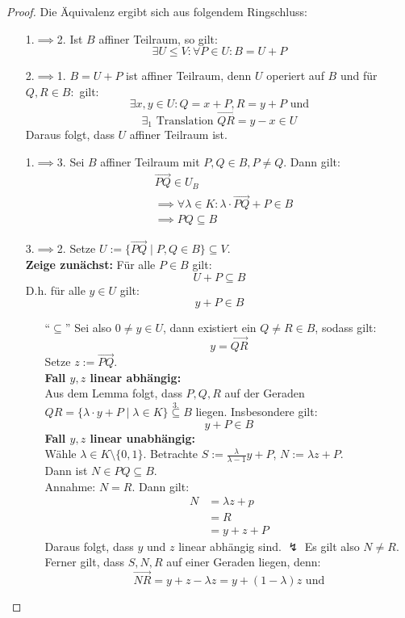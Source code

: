 \documentclass[parskip,a4paper,twoside,DIV15,BCOR12mm]{scrbook}
\begin{document}
\begin{proof}
Die Äquivalenz ergibt sich aus folgendem Ringschluss:
\begin{itemize}
\item[1.$\implies$2.] Ist $B$ affiner Teilraum, so gilt:
\[\exists U\le V:\forall P\in U:B=U+P\]
\item[2.$\implies$1.] $B=U+P$ ist affiner Teilraum, denn $U$ operiert auf $B$
und für $Q,R\in B:$ gilt:
\[\exists x,y\in U: Q=x+P,R=y+P \text{ und}\] 
\[\exists_1 \text{ Translation } \overrightarrow{QR}=y-x\in U\]
Daraus folgt, dass $U$ affiner Teilraum ist.
\item[1.$\implies$3.] Sei $B$ affiner Teilraum mit $P,Q\in B, P\ne Q$. Dann gilt:
\begin{align*}
&\overrightarrow{PQ}\in U_B\\
&\implies\forall \lambda\in K:\lambda\cdot\overrightarrow{PQ}+P\in B\\
&\implies PQ\subseteq B
\end{align*}
\item[3.$\implies$2.] Setze $U:=\{\overrightarrow{PQ}\mid P,Q\in B\}\subseteq V$.\\
\textbf{Zeige zunächst:} Für alle $P\in B$ gilt:
\[U+P\subseteq B\] 
D.h. für alle $y\in U$ gilt:
\[y+P\in B\]
\begin{enumerate}
\item["`$\subseteq$"'] Sei also $0\ne y\in U$, dann existiert ein $Q\ne R\in B$, sodass gilt: 
\[ y=\overrightarrow{QR}\] 
Setze $z:=\overrightarrow{PQ}$.\\
\textbf{Fall $y,z$ linear abhängig:}\\
Aus dem Lemma folgt, dass $P,Q,R$ auf der Geraden $QR=\{\lambda\cdot y+P\mid \lambda\in K\}
\stackrel{3.}{\subseteq} B$ liegen. Insbesondere gilt: 
\[y+P\in B\]
\textbf{Fall $y,z$ linear unabhängig:}\\
Wähle $\lambda\in K\setminus\{0,1\}$. Betrachte $S:=\frac{\lambda}{\lambda-1}y+P$, 
$N:=\lambda z+P$.\\
Dann ist $N\in PQ\subseteq B$.\\
Annahme: $N=R$.
Dann gilt:
\begin{align*}
N&=\lambda z+p\\
&=R\\
&=y+z+P
\end{align*}
Daraus folgt, dass $y$ und $z$ linear abhängig sind. $\lightning$
Es gilt also $N\ne R$. Ferner gilt, dass $S,N,R$ auf einer Geraden liegen, denn:
\[\overrightarrow{NR} = y+z-\lambda z = y+(1-\lambda)z \text{ und}\]

\end{enumerate}
\end{itemize}
\end{proof}
\end{document}
